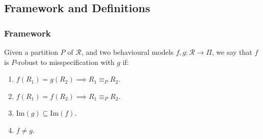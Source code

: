 \documentclass{beamer}
\begin{document}
\subsection{Framework and Definitions}

\begin{frame}
    \frametitle{Framework}
    \small
    Given a partition $P$ of $\mathcal{R}$, and two behavioural models $f, g : \mathcal{R} \to \Pi$, we say that $f$ is $P$-robust to misspecification with $g$ if:
    \vspace{0.25cm}
    \begin{enumerate}
        \item $f(R_1) = g(R_2) \implies R_1 \equiv_P R_2$.
        \item $f(R_1) = f(R_2) \implies R_1 \equiv_P R_2$.
        \item $\mathrm{Im}(g) \subseteq \mathrm{Im}(f)$.
        \item $f \neq g$.
    \end{enumerate}
    \vspace{0.5cm}
\end{frame}


\end{document}
